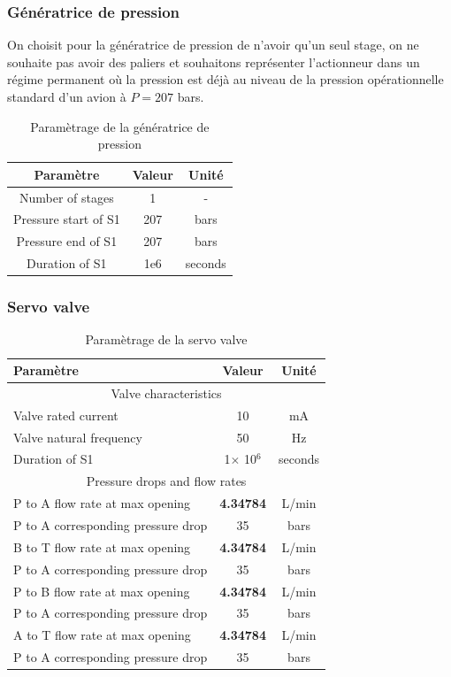 \documentclass[a4paper,12pt,calibri,oneside,openany]{book}
\theoremstyle{break}
\begin{document}
\subsubsection{Génératrice de pression}
On choisit pour la génératrice de pression de n'avoir qu'un seul stage, on ne souhaite pas avoir des paliers et souhaitons représenter l'actionneur dans un régime permanent où la pression est déjà au niveau de la pression opérationnelle standard d'un avion à $P = 207$ bars. 
\begin{table}[H]
	\centering
	\begin{tabular}{|c|c|c|}
		\hline
		\cellcolor{gray!30}Paramètre & \cellcolor{gray!30}Valeur & \cellcolor{gray!30}Unité\\
		\hline
		Number of stages & 1 & -\\
		\hline
		Pressure start of S1 & 207 & bars\\
		\hline 
		Pressure end of S1 & 207 & bars\\
		\hline
		Duration of S1 & 1e6 & seconds\\
		\hline
	\end{tabular}
\caption{Paramètrage de la génératrice de pression}
\end{table}
\subsubsection{Servo valve}
\begin{table}[H]
	\centering
	\begin{tabular}{|l|c|c|}
		\hline
		\cellcolor{gray!30}Paramètre & \cellcolor{gray!30}Valeur & \cellcolor{gray!30}Unité\\
		\hline
		\multicolumn{3}{c}{\cellcolor{green!30}Valve characteristics} \\
		\hline
		Valve rated current & 10 & mA\\
		\hline 
		Valve natural frequency & 50 & Hz\\
		\hline
		Duration of S1 & 1$\times$ 10$^6$ & seconds\\
		\hline
		\multicolumn{3}{c}{\cellcolor{green!30}Pressure drops and flow rates} \\
		\hline
		P to A flow rate at max opening & \textbf{4.34784} & L/min\\
		\hline
		P to A corresponding pressure drop & 35 & bars\\
		\hline
		B to T flow rate at max opening & \textbf{4.34784} & L/min\\
		\hline
		P to A corresponding pressure drop & 35 & bars\\
		\hline
		P to B flow rate at max opening & \textbf{4.34784} & L/min\\
		\hline
		P to A corresponding pressure drop & 35 & bars\\
		\hline
		A to T flow rate at max opening & \textbf{4.34784} & L/min\\
		\hline
		P to A corresponding pressure drop & 35 & bars\\
		\hline
	\end{tabular}
\caption{Paramètrage de la servo valve}
\end{table}
\end{document}
